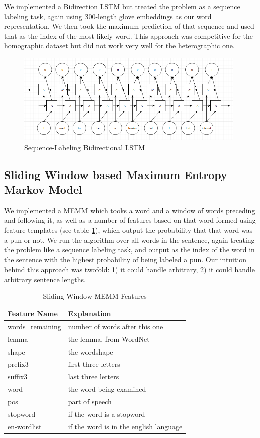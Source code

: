 \documentclass{article}
\begin{document}
We implemented a Bidirection LSTM but treated the problem as a sequence labeling
task, again using 300-length glove embeddings as our word representation. We
then took the maximum prediction of that sequence and used that as the index of
the most likely word. This approach was competitive for the homographic dataset
but did not work very well for the heterographic one.

\begin{figure}[h!]
	\centering
	\includegraphics[width=110mm]{figures/lstm.png}
	\caption{Sequence-Labeling Bidirectional LSTM}
	\label{fig:LSTM}
\end{figure}

\subsection{Sliding Window based Maximum Entropy Markov Model}

We implemented a MEMM which tooks a word and a window of words preceding and
following it, as well as a number of features based on that word formed using
feature templates (see table \ref{tab:memm_features}), which output the probability
that that word was a pun or not. We run the algorithm over all words in the
sentence, again treating the problem like a sequence labeling task, and output
as the index of the word in the sentence with the highest probability of being
labeled a pun. Our intuition behind this approach was twofold: 1) it could
handle arbitrary, 2) it could handle arbitrary sentence lengths. 

\begin{table}
\caption{Sliding Window MEMM Features}\label{tab:memm_features} 
\begin{center}
\begin{tabular}{l l} 
\toprule
\textbf{Feature Name} & \textbf{Explanation} \\
\midrule
words\_remaining & number of words after this one \\
lemma            & the lemma, from WordNet \\
shape            & the wordshape \\
prefix3          & first three letters \\
suffix3          & last three letters \\
word             & the word being examined \\
pos              & part of speech \\
stopword         & if the word is a stopword \\
en-wordlist      & if the word is in the english language \\
\bottomrule
\end{tabular}
\end{center}
\end{table}
\end{document}
